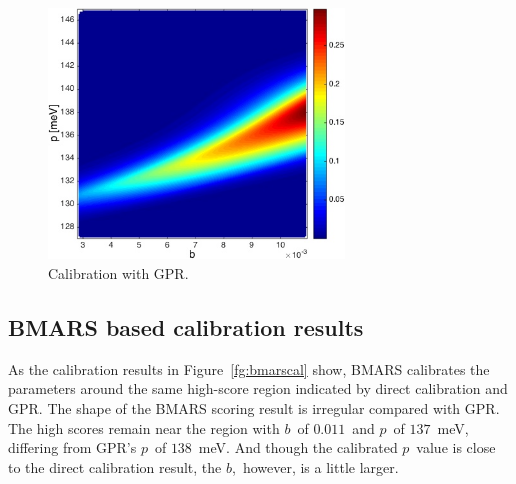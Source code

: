 \documentclass[review]{elsarticle}
\begin{document}
\begin{figure}[ht!]
  \begin{center}
    \includegraphics[width=0.7\textwidth]{NSE15-48R1_Figure12.jpg}
    \caption[]{\label{fg:gprcal}Calibration with GPR.}%
  \end{center}
\end{figure}

\subsection{BMARS based calibration results}
As the calibration results in Figure~\ref{fg:bmarscal} show, %
BMARS calibrates the parameters around the same  high-score region indicated by direct calibration and GPR. The shape of the BMARS scoring result is irregular compared with GPR. %
The high scores remain near the region with $b$~of $0.011$~and $p$~of $137$~meV, differing from GPR's $p$~of $138$~meV. And though the calibrated $p$~value is close to the direct calibration result, the $b$,~however, is a little larger. 
\end{document}
